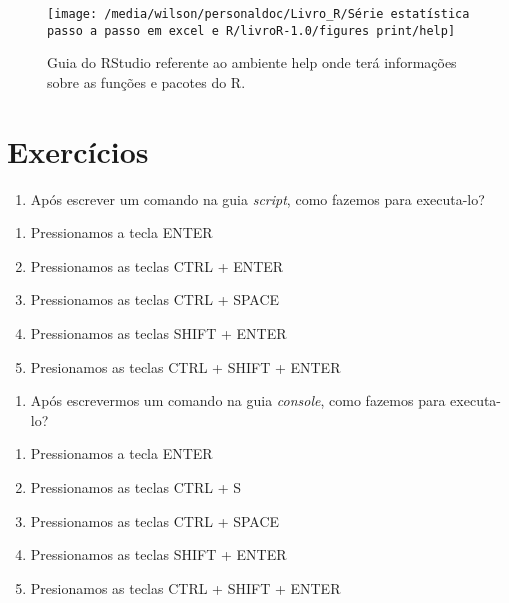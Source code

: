 \documentclass[14pt,titlepage, oneside, openany, a4paper]{book}
\providecommand{\tightlist}{%
  \setlength{\itemsep}{0pt}\setlength{\parskip}{0pt}}
\begin{document}
\begin{figure}[H]

{\centering \texttt{[image: /media/wilson/personaldoc/Livro\_R/Série estatística passo a passo em excel e R/livroR-1.0/figures print/help]} 

}

\caption{Guia do RStudio referente ao ambiente help onde terá informações sobre as funções e pacotes do R.}\label{fig:help}
\end{figure}

\hypertarget{exercuxedcios}{%
\section{Exercícios}\label{exercuxedcios}}

\begin{enumerate}
\def\labelenumi{\arabic{enumi})}
\tightlist
\item
  Após escrever um comando na guia \emph{script}, como fazemos para executa-lo?
\end{enumerate}

\begin{enumerate}
\def\labelenumi{(\alph{enumi})}
\tightlist
\item
  Pressionamos a tecla ENTER
\item
  Pressionamos as teclas CTRL + ENTER
\item
  Pressionamos as teclas CTRL + SPACE
\item
  Pressionamos as teclas SHIFT + ENTER
\item
  Presionamos as teclas CTRL + SHIFT + ENTER
\end{enumerate}

\begin{enumerate}
\def\labelenumi{\arabic{enumi})}
\setcounter{enumi}{1}
\tightlist
\item
  Após escrevermos um comando na guia \emph{console}, como fazemos para executa-lo?
\end{enumerate}

\begin{enumerate}
\def\labelenumi{(\alph{enumi})}
\tightlist
\item
  Pressionamos a tecla ENTER
\item
  Pressionamos as teclas CTRL + S
\item
  Pressionamos as teclas CTRL + SPACE
\item
  Pressionamos as teclas SHIFT + ENTER
\item
  Presionamos as teclas CTRL + SHIFT + ENTER
\end{enumerate}
\end{document}
